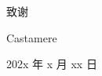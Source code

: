 
\begin{center} \heiti\sanhao 致谢 \end{center}

\lipsum[7-8]

\begin{flushright}
    Castamere

    202x 年 x 月 xx 日
\end{flushright}

\clearpage